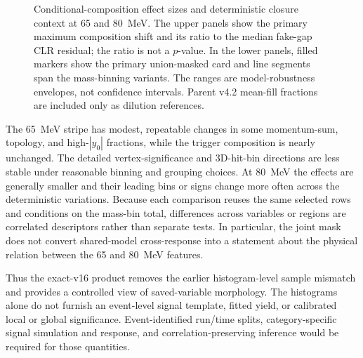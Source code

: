 \begin{figure}[H]
\centering
{}
\caption{Conditional-composition effect sizes and deterministic closure
context at 65 and 80~MeV.  The upper panels show the primary maximum
composition shift and its ratio to the median fake-gap CLR residual; the
ratio is not a $p$-value.  In the lower panels, filled markers show the
primary union-masked card and line segments span the mass-binning variants.
The ranges are model-robustness envelopes, not confidence intervals.  Parent
v4.2 mean-fill fractions are included only as dilution references.}
\label{fig:v4p3-effect-size-summary}
\end{figure}

The 65~MeV stripe has modest, repeatable changes in some momentum-sum,
topology, and high-$|y_0|$ fractions, while the trigger composition is nearly
unchanged.  The detailed vertex-significance and 3D-hit-bin directions are
less stable under reasonable binning and grouping choices.  At 80~MeV the
effects are generally smaller and their leading bins or signs change more
often across the deterministic variations.  Because each comparison reuses
the same selected rows and conditions on the mass-bin total, differences
across variables or regions are correlated descriptors rather than separate
tests.  In particular, the joint mask does not convert shared-model
cross-response into a statement about the physical relation between the
65 and 80~MeV features.

Thus the exact-v16 product removes the earlier histogram-level sample
mismatch and provides a controlled view of saved-variable morphology.  The
histograms alone do not furnish an event-level signal template, fitted yield,
or calibrated local or global significance.  Event-identified run/time
splits, category-specific signal simulation and response, and
correlation-preserving inference would be required for those quantities.
